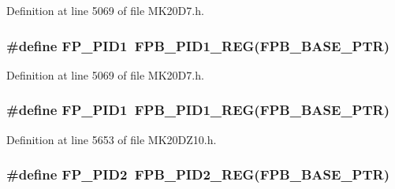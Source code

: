 Definition at line 5069 of file M\+K20\+D7.\+h.

\subsubsection[{\texorpdfstring{F\+P\+\_\+\+P\+I\+D1}{FP_PID1}}]{\setlength{\rightskip}{0pt plus 5cm}\#define F\+P\+\_\+\+P\+I\+D1~{\bf F\+P\+B\+\_\+\+P\+I\+D1\+\_\+\+R\+EG}({\bf F\+P\+B\+\_\+\+B\+A\+S\+E\+\_\+\+P\+TR})}\hypertarget{group___f_p_b___register___accessor___macros_ga53c955868f162231b4bdf5be5cfbc084}{}\label{group___f_p_b___register___accessor___macros_ga53c955868f162231b4bdf5be5cfbc084}


Definition at line 5069 of file M\+K20\+D7.\+h.

\subsubsection[{\texorpdfstring{F\+P\+\_\+\+P\+I\+D1}{FP_PID1}}]{\setlength{\rightskip}{0pt plus 5cm}\#define F\+P\+\_\+\+P\+I\+D1~{\bf F\+P\+B\+\_\+\+P\+I\+D1\+\_\+\+R\+EG}({\bf F\+P\+B\+\_\+\+B\+A\+S\+E\+\_\+\+P\+TR})}\hypertarget{group___f_p_b___register___accessor___macros_ga53c955868f162231b4bdf5be5cfbc084}{}\label{group___f_p_b___register___accessor___macros_ga53c955868f162231b4bdf5be5cfbc084}


Definition at line 5653 of file M\+K20\+D\+Z10.\+h.

\subsubsection[{\texorpdfstring{F\+P\+\_\+\+P\+I\+D2}{FP_PID2}}]{\setlength{\rightskip}{0pt plus 5cm}\#define F\+P\+\_\+\+P\+I\+D2~{\bf F\+P\+B\+\_\+\+P\+I\+D2\+\_\+\+R\+EG}({\bf F\+P\+B\+\_\+\+B\+A\+S\+E\+\_\+\+P\+TR})}\hypertarget{group___f_p_b___register___accessor___macros_gaa858bde712d7ddaf74a6e62c51bed1f9}{}\label{group___f_p_b___register___accessor___macros_gaa858bde712d7ddaf74a6e62c51bed1f9}


